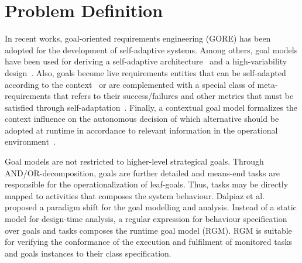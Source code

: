 


\section{Problem Definition}


In recent works, goal-oriented requirements engineering (GORE) has been adopted for the development of self-adaptive systems. Among others, goal models have been used for deriving a self-adaptive architecture~\cite{Tang:2009} and a high-variability design~\cite{Yu:2008}. Also, goals become live requirements entities that can be self-adapted according to the context~\cite{Baresi:2010:1,Baresi:2010:2} or are complemented with a special class of meta-requirements that refers to their success/failures and other metrics that must be satisfied through self-adaptation~\cite{Souza:2011}. Finally, a contextual goal model formalizes the context influence on the autonomous decision of which alternative should be adopted at runtime in accordance to relevant information in the operational environment~\cite{Ali:2010}.

Goal models are not restricted to higher-level strategical goals. Through AND/OR-decomposition, goals are further detailed and means-end tasks are responsible for the operationalization of leaf-goals. Thus, tasks may be directly mapped to activities that composes the system behaviour. Dalpiaz et al.~\cite{Dalpiaz:2013} proposed a paradigm shift for the goal modelling and analysis. Instead of a static model for design-time analysis, a regular expression for behaviour specification over goals and tasks composes the runtime goal model (RGM). RGM is suitable for verifying the conformance of the execution and fulfilment of monitored tasks and goals instances to their class specification.

